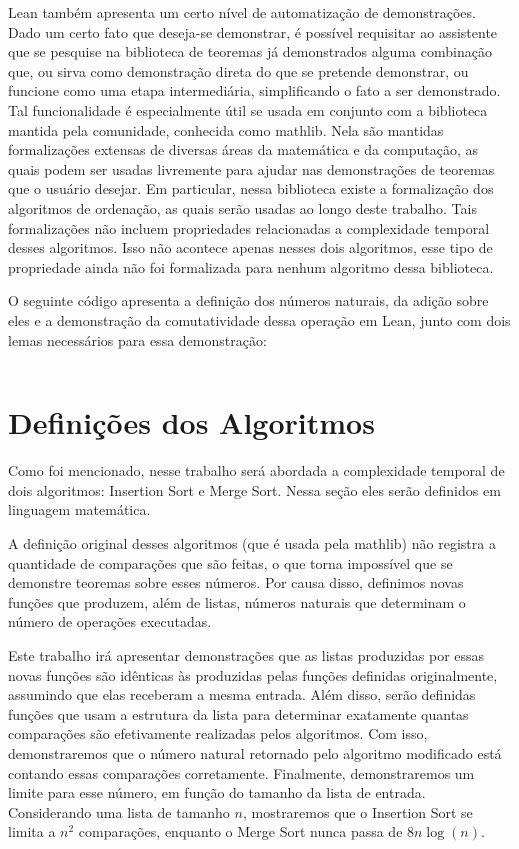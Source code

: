 \documentclass[12pt, oneside, a4paper,english,brazil]{abntex2}
\begin{document}
\qquad Lean tamb\'em apresenta um certo n\'ivel de automatiza\c{c}\~ao de demonstra\c{c}\~oes. Dado um certo fato que deseja-se demonstrar, \'e poss\'ivel requisitar ao assistente que se pesquise na biblioteca de teoremas j\'a demonstrados alguma combina\c{c}\~ao que, ou sirva como demonstra\c{c}\~ao direta do que se pretende demonstrar, ou funcione como uma etapa intermedi\'aria, simplificando o fato a ser demonstrado. Tal funcionalidade \'e especialmente \'util se usada em conjunto com a biblioteca mantida pela comunidade, conhecida como mathlib\cite{3}. Nela s\~ao mantidas formaliza\c{c}\~oes extensas de diversas \'areas da matem\'atica e da computa\c{c}\~ao, as quais podem ser usadas livremente para ajudar nas demonstra\c{c}\~oes de teoremas que o usu\'ario desejar. Em particular, nessa biblioteca existe a formaliza\c{c}\~ao dos algoritmos de ordena\c{c}\~ao, as quais ser\~ao usadas ao longo deste trabalho. Tais formaliza\c{c}\~oes
n\~ao incluem propriedades relacionadas a complexidade temporal desses algoritmos. Isso n\~ao acontece
apenas nesses dois algoritmos,
esse tipo de propriedade ainda n\~ao foi formalizada para nenhum algoritmo dessa biblioteca.

\qquad O seguinte c\'odigo apresenta a defini\c{c}\~ao dos n\'umeros naturais, da adi\c{c}\~ao sobre eles e a demonstra\c{c}\~ao da comutatividade dessa opera\c{c}\~ao em Lean, junto com dois lemas necess\'arios para essa demonstra\c{c}\~ao:
\newpage

\inputminted{lean}{add.lean}

\chapter{Defini\c{c}\~oes dos Algoritmos}

\qquad Como foi mencionado, nesse trabalho ser\'a abordada a complexidade
temporal de dois algoritmos: Insertion Sort e Merge Sort. Nessa se\c{c}\~ao
eles ser\~ao definidos em linguagem matem\'atica.

\qquad A defini\c{c}\~ao original desses algoritmos (que \'e usada pela mathlib)
n\~ao registra a quantidade de compara\c{c}\~oes que
s\~ao feitas, o que torna imposs\'ivel que se demonstre
teoremas sobre esses n\'umeros. Por causa
disso, definimos novas fun\c{c}\~oes que produzem, al\'em de listas,
n\'umeros naturais que determinam o n\'umero de opera\c{c}\~oes executadas.

\qquad Este trabalho ir\'a apresentar demonstra\c{c}\~oes que as listas
produzidas por essas novas fun\c{c}\~oes s\~ao id\^enticas \`as produzidas pelas
fun\c{c}\~oes definidas originalmente, assumindo que elas receberam a mesma entrada. Al\'em
disso, ser\~ao definidas fun\c{c}\~oes que usam a estrutura da lista para
determinar exatamente quantas compara\c{c}\~oes s\~ao efetivamente realizadas
pelos algoritmos. Com isso, demonstraremos que o n\'umero natural retornado pelo
algoritmo modificado est\'a contando essas compara\c{c}\~oes corretamente. Finalmente,
demonstraremos um limite para esse n\'umero, em fun\c{c}\~ao do tamanho da lista de entrada.
Considerando uma lista de tamanho $n$, mostraremos que o Insertion Sort se limita a $n^{2}$
compara\c{c}\~oes, enquanto o Merge Sort nunca passa de $8 n \log (n)$.
\end{document}
